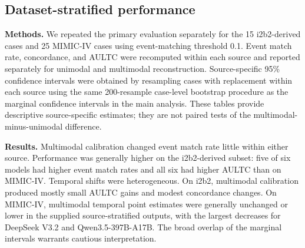 \FloatBarrier
\subsection{Dataset-stratified performance}\label{ch08:supp:dataset-stratified}
\noindent
\textbf{Methods.} We repeated the primary evaluation separately for the 15 i2b2-derived cases and 25 MIMIC-IV cases using event-matching threshold 0.1. Event match rate, concordance, and AULTC were recomputed within each source and reported separately for unimodal and multimodal reconstruction. Source-specific 95\% confidence intervals were obtained by resampling cases with replacement within each source using the same 200-resample case-level bootstrap procedure as the marginal confidence intervals in the main analysis. These tables provide descriptive source-specific estimates; they are not paired tests of the multimodal-minus-unimodal difference.

\noindent
\textbf{Results.} Multimodal calibration changed event match rate little within either source. Performance was generally higher on the i2b2-derived subset: five of six models had higher event match rates and all six had higher AULTC than on MIMIC-IV. Temporal shifts were heterogeneous. On i2b2, multimodal calibration produced mostly small AULTC gains and modest concordance changes. On MIMIC-IV, multimodal temporal point estimates were generally unchanged or lower in the supplied source-stratified outputs, with the largest decreases for DeepSeek V3.2 and Qwen3.5-397B-A17B. The broad overlap of the marginal intervals warrants cautious interpretation.

\par\medskip
\noindent

\par\medskip

\par\medskip
\noindent

\par\medskip

